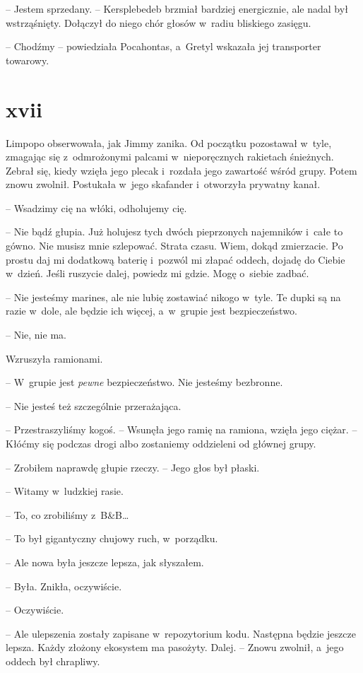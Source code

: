 \documentclass[oneside,polish,11pt,sfheadings]{mwbk}
\begin{document}
-- Jestem sprzedany. -- Kersplebedeb brzmiał bardziej energicznie, ale
nadal był wstrząśnięty. Dołączył do niego chór głosów w~radiu bliskiego
zasięgu.

-- Chodźmy -- powiedziała Pocahontas, a~Gretyl wskazała jej transporter
towarowy.

\chapter*{xvii}

Limpopo obserwowała, jak Jimmy zanika. Od początku pozostawał w~tyle,
zmagając się z~odmrożonymi palcami w~nieporęcznych rakietach śnieżnych.
Zebrał się, kiedy wzięła jego plecak i~rozdała jego zawartość wśród
grupy. Potem znowu zwolnił. Postukała w~jego skafander i~otworzyła
prywatny kanał.

-- Wsadzimy cię na włóki, odholujemy cię.

-- Nie bądź głupia. Już holujesz tych dwóch pieprzonych najemników i~całe
to gówno. Nie musisz mnie szlepować. Strata czasu. Wiem, dokąd
zmierzacie. Po prostu daj mi dodatkową baterię i~pozwól mi złapać
oddech, dojadę do Ciebie w~dzień. Jeśli ruszycie dalej, powiedz mi
gdzie. Mogę o~siebie zadbać.

-- Nie jesteśmy marines, ale nie lubię zostawiać nikogo w~tyle. Te dupki
są na razie w~dole, ale będzie ich więcej, a~w~grupie jest
bezpieczeństwo.

-- Nie, nie ma.

Wzruszyła ramionami. 

-- W~grupie jest \textit{pewne }bezpieczeństwo. Nie
jesteśmy bezbronne.

-- Nie jesteś też szczególnie przerażająca.

-- Przestraszyliśmy kogoś. -- Wsunęła jego ramię na ramiona, wzięła jego
ciężar. -- Kłóćmy się podczas drogi albo zostaniemy oddzieleni od głównej
grupy.

-- Zrobiłem naprawdę głupie rzeczy. -- Jego głos był płaski.

-- Witamy w~ludzkiej rasie.

-- To, co zrobiliśmy z~B\&B\ldots 

-- To był gigantyczny chujowy ruch, w~porządku.

-- Ale nowa była jeszcze lepsza, jak słyszałem.

-- Była. Znikła, oczywiście.

-- Oczywiście.

-- Ale ulepszenia zostały zapisane w~repozytorium kodu. Następna będzie
jeszcze lepsza. Każdy złożony ekosystem ma pasożyty. Dalej. -- Znowu
zwolnił, a~jego oddech był chrapliwy. 
\end{document}

